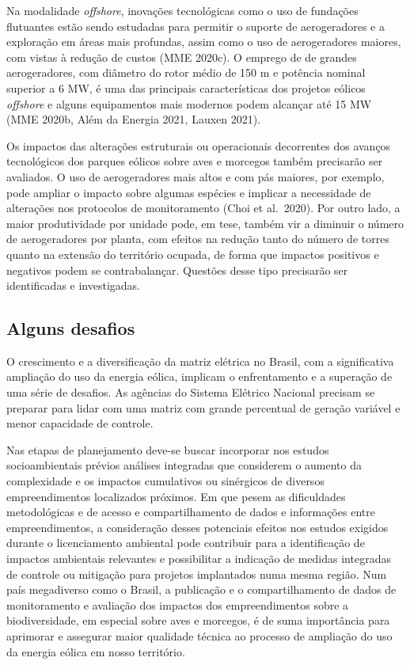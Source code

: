 \documentclass[
  oneside]{scrbook}
\begin{document}
Na modalidade \emph{offshore}, inovações tecnológicas como o uso de fundações flutuantes estão sendo estudadas para permitir o suporte de aerogeradores e a exploração em áreas mais profundas, assim como o uso de aerogeradores maiores, com vistas à redução de custos (MME 2020c). O emprego de de grandes aerogeradores, com diâmetro do rotor médio de 150 m e potência nominal superior a 6 MW, é uma das principais características dos projetos eólicos \emph{offshore} e alguns equipamentos mais modernos podem alcançar até 15 MW (MME 2020b, Além da Energia 2021, Lauxen 2021).

Os impactos das alterações estruturais ou operacionais decorrentes dos avanços tecnológicos dos parques eólicos sobre aves e morcegos também precisarão ser avaliados. O uso de aerogeradores mais altos e com pás maiores, por exemplo, pode ampliar o impacto sobre algumas espécies e implicar a necessidade de alterações nos protocolos de monitoramento (Choi et al.~2020). Por outro lado, a maior produtividade por unidade pode, em tese, também vir a diminuir o número de aerogeradores por planta, com efeitos na redução tanto do número de torres quanto na extensão do território ocupada, de forma que impactos positivos e negativos podem se contrabalançar. Questões desse tipo precisarão ser identificadas e investigadas.

\hypertarget{alguns-desafios}{%
\subsection{Alguns desafios}\label{alguns-desafios}}

O crescimento e a diversificação da matriz elétrica no Brasil, com a significativa ampliação do uso da energia eólica, implicam o enfrentamento e a superação de uma série de desafios. As agências do Sistema Elétrico Nacional precisam se preparar para lidar com uma matriz com grande percentual de geração variável e menor capacidade de controle.

Nas etapas de planejamento deve-se buscar incorporar nos estudos socioambientais prévios análises integradas que considerem o aumento da complexidade e os impactos cumulativos ou sinérgicos de diversos empreendimentos localizados próximos. Em que pesem as dificuldades metodológicas e de acesso e compartilhamento de dados e informações entre empreendimentos, a consideração desses potenciais efeitos nos estudos exigidos durante o licenciamento ambiental pode contribuir para a identificação de impactos ambientais relevantes e possibilitar a indicação de medidas integradas de controle ou mitigação para projetos implantados numa mesma região. Num país megadiverso como o Brasil, a publicação e o compartilhamento de dados de monitoramento e avaliação dos impactos dos empreendimentos sobre a biodiversidade, em especial sobre aves e morcegos, é de suma importância para aprimorar e assegurar maior qualidade técnica ao processo de ampliação do uso da energia eólica em nosso território.
\end{document}
